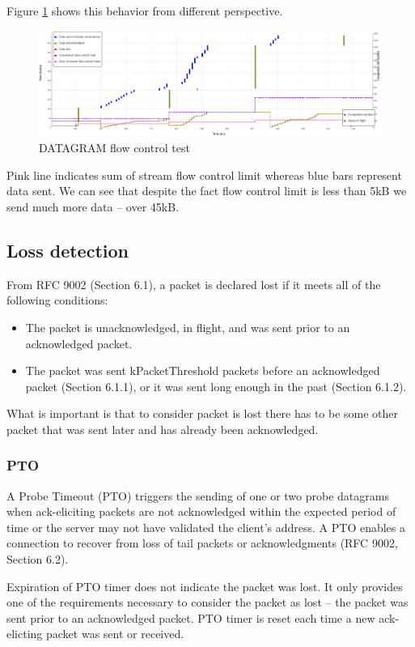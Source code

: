 Figure \ref{fig:dgram_flow_control2} shows this behavior from different perspective.
\begin{figure}[h]
  \centering
  \includegraphics[width=\textwidth]{img/__09__datagrams/dgram_flow_control_2.png}
  \caption{DATAGRAM flow control test}
  \label{fig:dgram_flow_control2}
\end{figure}
Pink line indicates sum of stream flow control limit whereas blue bars represent data sent. 
We can see that despite the fact flow control limit is less than 5kB we send much more data -- over 45kB.

\subsection{Loss detection}
\label{sec:loss-detection}
From RFC 9002 (Section 6.1), a packet is declared lost if it meets all of the following conditions:
\begin{itemize}
    \item The packet is unacknowledged, in flight, and was sent prior to an acknowledged packet.
    \item The packet was sent kPacketThreshold packets before an acknowledged packet (Section 6.1.1), or it was sent long enough in the past (Section 6.1.2). \cite{rfc9002}
\end{itemize}

What is important is that to consider packet is lost there has to be some other packet that was sent later and has already been acknowledged.

\subsubsection{PTO}
A Probe Timeout (PTO) triggers the sending of one or two probe datagrams when ack-eliciting packets are not acknowledged within the expected period of time or the server may not have validated the client's address. A PTO enables a connection to recover from loss of tail packets or acknowledgments \cite{rfc9002} (RFC 9002, Section 6.2).

Expiration of PTO timer does not indicate the packet was lost.
It only provides one of the requirements necessary to consider the packet as lost -- the packet was sent prior to an acknowledged packet. PTO timer is reset each time a new ack-elicting packet was sent or received.

